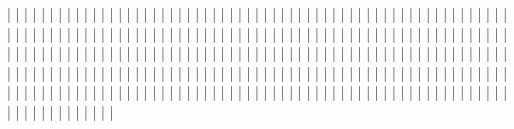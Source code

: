         |     |     |
        |     |     |
        |     |     |
        |     |     |
        |     |     |
        |     |     |
        |     |     |
        |     |     |
        |     |     |
        |     |     |
        |     |     |
        |     |     |
        |     |     |
        |     |     |
        |     |     |
        |     |     |
        |     |     |
        |     |     |
        |     |     |
        |     |     |
        |     |     |
        |     |     |
        |     |     |
        |     |     |
        |     |     |
        |     |     |
        |     |     |
        |     |     |
        |     |     |
        |     |     |
        |     |     |
        |     |     |
        |     |     |
        |     |     |
        |     |     |
        |     |     |
        |     |     |
        |     |     |
        |     |     |
        |     |     |
        |     |     |
        |     |     |
        |     |     |
        |     |     |
        |     |     |
        |     |     |
        |     |     |
        |     |     |
        |     |     |
        |     |     |
        |     |     |
        |     |     |
        |     |     |
        |     |     |
        |     |     |
        |     |     |
        |     |     |
        |     |     |
        |     |     |
        |     |     |
        |     |     |
        |     |     |
        |     |     |
        |     |     |
        |     |     |
        |     |     |
        |     |     |
        |     |     |
        |     |     |
        |     |     |
        |     |     |
        |     |     |
        |     |     |
        |     |     |
        |     |     |
        |     |     |
        |     |     |
        |     |     |
        |     |     |
        |     |     |
        |     |     |
        |     |     |
        |     |     |
        |     |     |
        |     |     |
        |     |     |
        |     |     |
        |     |     |
        |     |     |
        |     |     |
        |     |     |
        |     |     |
        |     |     |
        |     |     |
        |     |     |
        |     |     |
        |     |     |
        |     |     |
        |     |     |
        |     |     |
        |     |     |
        |     |     |
        |     |